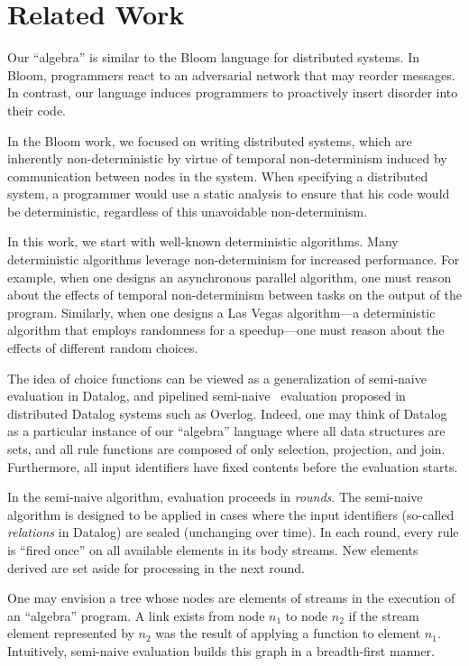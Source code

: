 \section{Related Work}
\label{sec:relwork}

Our
``algebra'' is similar to the Bloom language for distributed systems.  In
Bloom, programmers react to an adversarial network that may reorder messages.  In contrast, our language induces programmers to proactively insert disorder into their code.

In the Bloom work, we focused on writing distributed systems, which are inherently non-deterministic by virtue of temporal non-determinism induced by communication between nodes in the system.  When specifying a distributed system, a programmer would use a static analysis to ensure that his code would be deterministic, regardless of this unavoidable non-determinism.~\cite{cidr11}

In this work, we start with well-known deterministic algorithms.  Many deterministic algorithms leverage non-determinism for increased performance.  For example, when one designs an asynchronous parallel algorithm, one must reason about the effects of temporal non-determinism between tasks on the output of the program.  Similarly, when one designs a Las Vegas algorithm---a deterministic algorithm that employs randomness for a speedup---one must reason about the effects of different random choices.

The idea of choice functions can be viewed as a generalization of semi-naive~\cite{seminaive} evaluation in Datalog, and pipelined semi-naive~\cite{loo-sigmod06} evaluation proposed in distributed Datalog systems such as Overlog.  Indeed, one may think of Datalog as a particular instance of our ``algebra'' language where all data structures are sets, and all rule functions are composed of only selection, projection, and join.  Furthermore, all input identifiers have fixed contents before the evaluation starts.

In the semi-naive algorithm, evaluation proceeds in {\em rounds}.  The semi-naive algorithm is designed to be applied in cases where the input identifiers (so-called {\em relations} in Datalog) are sealed (unchanging over time).  In each round, every rule is ``fired once'' on all available elements in its body streams.  New elements derived are set aside for processing in the next round.

One may envision a tree whose nodes are elements of streams in the execution of an ``algebra'' program.  A link exists from node $n_1$ to node $n_2$ if the stream element represented by $n_2$ was the result of applying a function to element $n_1$.  Intuitively, semi-naive evaluation builds this graph in a breadth-first manner.

